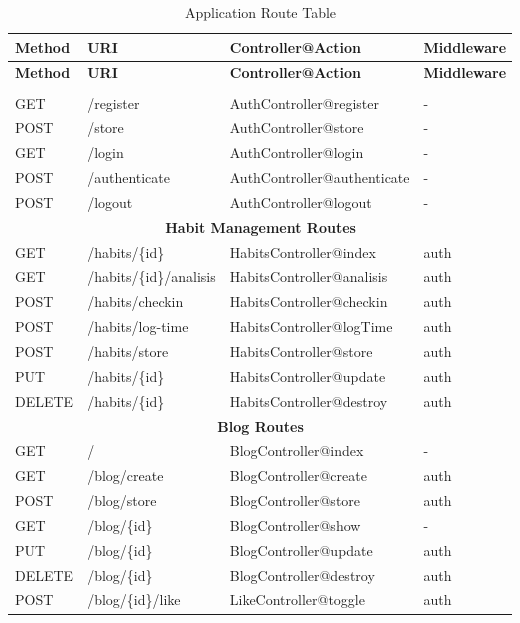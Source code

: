 \documentclass[12pt,a4paper]{report}
\begin{document}
\begin{longtable}{|p{1.5cm}|p{4.5cm}|p{4.5cm}|p{2.5cm}|}
\caption{Application Route Table} \label{tab:routes} \\
\hline
\textbf{Method} & \textbf{URI} & \textbf{Controller@Action} & \textbf{Middleware} \\
\hline
\endfirsthead
\hline
\textbf{Method} & \textbf{URI} & \textbf{Controller@Action} & \textbf{Middleware} \\
\hline
\endhead
\hline
\endfoot
\multicolumn{4}{|c|}{\textbf{Authentication Routes}} \\
\hline
GET & /register & AuthController@register & - \\
POST & /store & AuthController@store & - \\
GET & /login & AuthController@login & - \\
POST & /authenticate & AuthController@authenticate & - \\
POST & /logout & AuthController@logout & - \\
\hline
\multicolumn{4}{|c|}{\textbf{Habit Management Routes}} \\
\hline
GET & /habits/\{id\} & HabitsController@index & auth \\
GET & /habits/\{id\}/analisis & HabitsController@analisis & auth \\
POST & /habits/checkin & HabitsController@checkin & auth \\
POST & /habits/log-time & HabitsController@logTime & auth \\
POST & /habits/store & HabitsController@store & auth \\
PUT & /habits/\{id\} & HabitsController@update & auth \\
DELETE & /habits/\{id\} & HabitsController@destroy & auth \\
\hline
\multicolumn{4}{|c|}{\textbf{Blog Routes}} \\
\hline
GET & / & BlogController@index & - \\
GET & /blog/create & BlogController@create & auth \\
POST & /blog/store & BlogController@store & auth \\
GET & /blog/\{id\} & BlogController@show & - \\
PUT & /blog/\{id\} & BlogController@update & auth \\
DELETE & /blog/\{id\} & BlogController@destroy & auth \\
POST & /blog/\{id\}/like & LikeController@toggle & auth \\

\end{longtable}
\end{document}
